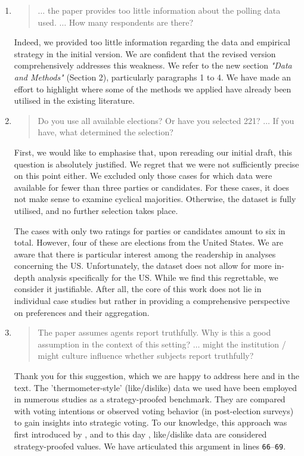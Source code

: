 \documentclass[a4paper, 12pt]{scrartcl}
\begin{document}
\begin{enumerate}[label=(\alph*)] 
	\item
\begin{quote}
$\ldots$ the paper provides too little information about the polling data used. $\ldots$ How many respondents are there?
\end{quote}	
Indeed, we provided too little information regarding the data and empirical strategy in the initial version. We are confident that the revised version comprehensively addresses this weakness. We refer to the new section \textit{"Data and Methods"} (Section 2), particularly paragraphs 1 to 4. We have made an effort to highlight where some of the methods we applied have already been utilised in the existing literature.
\item 
\begin{quote}
	Do you use all available elections? Or have you selected 221? $\ldots$ If you have, what determined the selection?
\end{quote}
First, we would like to emphasise that, upon rereading our initial draft, this question is absolutely justified. We regret that we were not sufficiently precise on this point either. We excluded only those cases for which data were available for fewer than three parties or candidates. For these cases, it does not make sense to examine cyclical majorities. Otherwise, the dataset is fully utilised, and no further selection takes place. 

The cases with only two ratings for parties or candidates amount to six in total. However, four of these are elections from the United States. We are aware that there is particular interest among the readership in analyses concerning the US. Unfortunately, the dataset does not allow for more in-depth analysis specifically for the US. While we find this regrettable, we consider it justifiable. After all, the core of this work does not lie in individual case studies but rather in providing a comprehensive perspective on preferences and their aggregation.
\item \begin{quote}
	The paper assumes agents report truthfully. Why is this a good assumption in the context of this setting? $\ldots$ might the institution / might culture influence whether subjects report truthfully?
\end{quote}

Thank you for this suggestion, which we are happy to address here and in the text. The 'thermometer-style' (like/dislike) data we used have been employed in numerous studies as a strategy-proofed benchmark. They are compared with voting intentions or observed voting behavior (in post-election surveys) to gain insights into strategic voting. To our knowledge, this approach was first introduced by \citet{Abramson2009}, and to this day \citep{Eggers2020, Eggers2022, Nunez2024, Eggers2024}, like/dislike data are considered strategy-proofed values. We have articulated this argument in lines \texttt{66$–$69}.


\end{enumerate}
\end{document}
